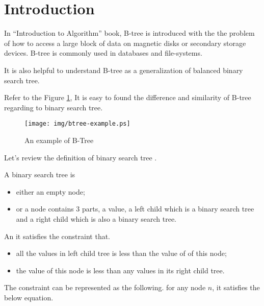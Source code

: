 \documentclass{article}
\begin{document}
\maketitle

\section{Introduction}
\label{introduction}

In ``Introduction to Algorithm'' book, B-tree is introduced with the the problem of how to access a
large block of data on magnetic disks or secondary storage devices\cite{CLRS}.
B-tree is commonly used in databases and file-systems.

It is also helpful to understand B-tree as a generalization of balanced binary
search tree\cite{wiki-b-tree}.

Refer to the Figure \ref{fig:btree-example}, It is easy to found the difference
and similarity of B-tree regarding to binary search tree.

\begin{figure}[htbp]
       \begin{center}
	\texttt{[image: img/btree-example.ps]}
        \caption{An example of B-Tree} \label{fig:btree-example}
       \end{center}
\end{figure}

Let's review the definition of binary search tree \cite{lxy-bst}.

A binary search tree is 
\begin{itemize}
\item either an empty node;
\item or a node contains 3 parts, a value, a left child which is a
binary search tree and a right child which is also a binary search tree.
\end{itemize}

An it satisfies the constraint that.
\begin{itemize}
\item all the values in left child tree is less than the value of of this node;
\item the value of this node is less than any values in its right child tree.
\end{itemize}

The constraint can be represented as the following. for any node $n$,
it satisfies the below equation.
\end{document}
